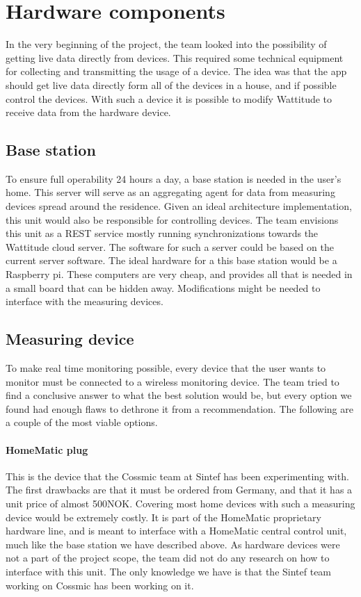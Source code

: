 \section{Hardware components}
In the very beginning of the project, the team looked into the possibility of getting live data directly from devices. This required some technical equipment for collecting and transmitting the usage of a device. The idea was that the app should get live data directly form all of the devices in a house, and if possible control the devices. With such a device it is possible to modify Wattitude to receive data from the hardware device.

\subsection{Base station}
To ensure full operability 24 hours a day, a base station is needed in the user's home. This server will serve as an aggregating agent for data from measuring devices spread around the residence. Given an ideal architecture implementation, this unit would also be responsible for controlling devices. The team envisions this unit as a REST service mostly running synchronizations towards the Wattitude cloud server. The software for such a server could be based on the current server software. The ideal hardware for a this base station would be a Raspberry pi. These computers are very cheap, and provides all that is needed in a small board that can be hidden away. Modifications might be needed to interface with the measuring devices. 

\subsection{Measuring device}
To make real time monitoring possible, every device that the user wants to monitor must be connected to a wireless monitoring device. The team tried to find a conclusive answer to what the best solution would be, but every option we found had enough flaws to dethrone it from a recommendation. The following are a couple of the most viable options.

\paragraph{HomeMatic plug}
This is the device that the Cossmic team at Sintef has been experimenting with. The first drawbacks are that it must be ordered from Germany, and that it has a unit price of almost 500NOK. Covering most home devices with such a measuring device would be extremely costly. It is part of the HomeMatic proprietary hardware line, and is meant to interface with a HomeMatic central control unit, much like the base station we have described above. As hardware devices were not a part of the project scope, the team did not do any research on how to interface with this unit. The only knowledge we have is that the Sintef team working on Cossmic has been working on it.

